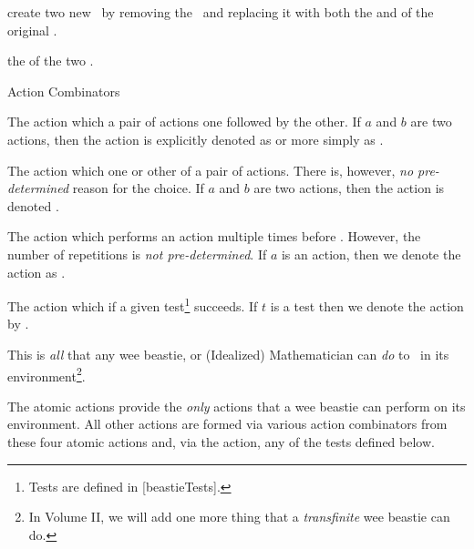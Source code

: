 \item create two new  \lols\ by removing the  
\lol\ and replacing it with both the  and 
 of the original \lol. 

\item {} the  of the  two \lols. 

\stopitemize

\item Action Combinators

\startitemize[n]

\item The action which  a pair of actions one followed by 
the other. If $a$ and $b$ are two actions, then the  
action is explicitly denoted as  or more 
simply as . 

\item The action which  one or other of a pair of actions. 
There is, however, \emph{no pre-determined} reason for the choice. If $a$ 
and $b$ are two actions, then the  
action is denoted .


\item The action which performs an action multiple times before 
. However, the number of repetitions is \emph{not 
pre-determined}. If $a$ is an action, then we denote the 
 action as . 

\item The action which  if a given test\footnote{Tests 
are defined in [beastieTests].} succeeds. If $t$ is a test 
then we denote the  action by . 

\stopitemize

\stopitemize

\noindent This is \emph{all} that any wee beastie, or (Idealized) 
Mathematician can \emph{do} to \lols\ in its environment\footnote{In 
Volume II, we will add one more thing that a \emph{transfinite} wee 
beastie can do.}. 

\stopDefinition

\startMMundi

The atomic actions provide the \emph{only} actions that a wee beastie can 
perform \emph{} on its environment. All other actions are 
formed via various action combinators from these four atomic actions and, 
via the  action, any of the tests defined below. 

